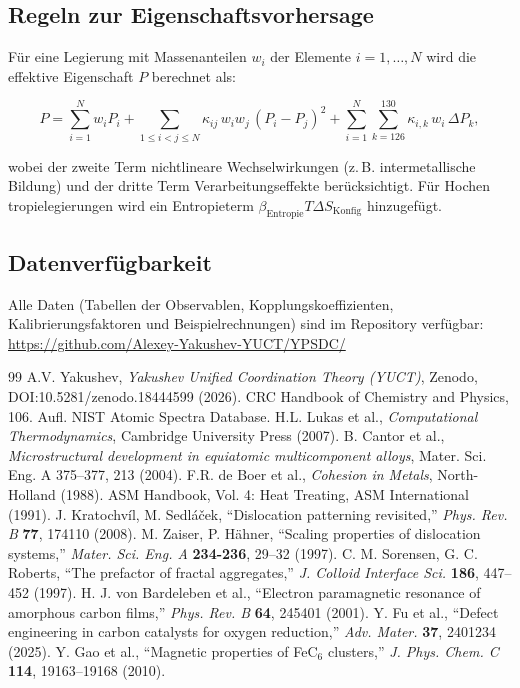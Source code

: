 \documentclass[12pt,a4paper]{article}
\begin{document}
\subsection{Regeln zur Eigenschaftsvorhersage}

Für eine Legierung mit Massenanteilen \(w_i\) der Elemente \(i=1,\dots,N\) wird die effektive Eigenschaft \(P\) berechnet als:

\[
P = \sum_{i=1}^{N} w_i P_i
+ \sum_{1\le i<j\le N} \kappa_{ij}\, w_i w_j\, (P_i - P_j)^2
+ \sum_{i=1}^{N} \sum_{k=126}^{130} \kappa_{i,k}\, w_i\, \Delta P_k,
\]

wobei der zweite Term nichtlineare Wechselwirkungen (z. B. intermetallische Bildung) und der dritte Term Verarbeitungseffekte berücksichtigt. Für Hochen tropielegierungen wird ein Entropieterm \(\beta_{\text{Entropie}} T \Delta S_{\text{Konfig}}\) hinzugefügt.

\subsection{Datenverfügbarkeit}

Alle Daten (Tabellen der Observablen, Kopplungskoeffizienten, Kalibrierungsfaktoren und Beispielrechnungen) sind im Repository verfügbar:
\url{https://github.com/Alexey-Yakushev-YUCT/YPSDC/}

	
	\begin{thebibliography}{99}
		 A.V. Yakushev, \emph{Yakushev Unified Coordination Theory (YUCT)}, Zenodo, DOI:10.5281/zenodo.18444599 (2026).
		 CRC Handbook of Chemistry and Physics, 106. Aufl.
		 NIST Atomic Spectra Database.
		 H.L. Lukas et al., \emph{Computational Thermodynamics}, Cambridge University Press (2007).
		 B. Cantor et al., \emph{Microstructural development in equiatomic multicomponent alloys}, Mater. Sci. Eng. A 375–377, 213 (2004).
		 F.R. de Boer et al., \emph{Cohesion in Metals}, North-Holland (1988).
		 ASM Handbook, Vol. 4: Heat Treating, ASM International (1991).
		 J. Kratochv\'il, M. Sedl\'a\v{c}ek, ``Dislocation patterning revisited,'' \emph{Phys. Rev. B} \textbf{77}, 174110 (2008).
		 M. Zaiser, P. H\"ahner, ``Scaling properties of dislocation systems,'' \emph{Mater. Sci. Eng. A} \textbf{234-236}, 29–32 (1997).
		 C. M. Sorensen, G. C. Roberts, ``The prefactor of fractal aggregates,'' \emph{J. Colloid Interface Sci.} \textbf{186}, 447–452 (1997).
		 H. J. von Bardeleben et al., ``Electron paramagnetic resonance of amorphous carbon films,'' \emph{Phys. Rev. B} \textbf{64}, 245401 (2001).
		 Y. Fu et al., ``Defect engineering in carbon catalysts for oxygen reduction,'' \emph{Adv. Mater.} \textbf{37}, 2401234 (2025).
		 Y. Gao et al., ``Magnetic properties of FeC$_6$ clusters,'' \emph{J. Phys. Chem. C} \textbf{114}, 19163–19168 (2010).
	\end{thebibliography}
	
	
	
\end{document}
